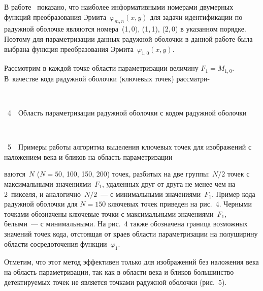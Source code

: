 \begin{multicols}{2}
В работе~\cite{5pav} показано, что наиболее информативными номерами двумерных функций 
преобразования Эрмита~$\varphi_{m,n}(x,y)$ для задачи идентификации по радужной оболочке 
являются номера~(1,\,0), (1,\,1), (2,\,0) в указанном порядке. Поэтому для параметризации данных 
радужной оболочки в данной работе была выбрана функция пре\-обра\-зо\-ва\-ния Эрмита~$\varphi_{1,0}(x,y)$. 

Рассмотрим в каждой точке области парамет\-ризации величину $F_1=M_{1,0}$. В~качестве кода 
радужной оболочки (ключевых точек) рассматри-\linebreak\vspace*{-12pt}
\pagebreak

\noindent
\begin{center} %
\mbox{%
\epsfxsize=80mm %
}
\end{center}
{{\figurename~4}\ \ \small{Область параметризации радужной оболочки с кодом радужной оболочки}}

\vspace*{18pt}

 
\begin{center}
\mbox{%
\epsfxsize=80mm %
}
\end{center}
{{\figurename~5}\ \ \small{Примеры работы алгоритма выделения ключевых точек для изображений с наложением века и бликов на область 
параметризации}}


\bigskip
\medskip
\addtocounter{figure}{2}

\noindent
ваются~$N$ ($N = 50$, 100, 150, 200) точек, 
разбитых на две группы: $N/2$ точек с максимальными значениями~$F_1$, удаленных друг от 
друга не менее чем на 2~пикселя, и аналогично~$N/2$~--- с минимальными значениями~$F_1$. 
Пример кода радужной оболочки для $N = 150$ ключевых точек приведен на рис.~4. 
Черными точками обозначены ключевые точки с максимальными значениями~$F_1$, белыми~--- 
с минимальными. На рис.~4 также обозначена граница возможных значений точек кода, 
отстоящая от краев области параметризации на полуширину области сосредоточения 
функции~$\varphi_1$.


Отметим, что этот метод эффективен только для изображений без наложения века на область 
параметризации, так как в области века и бликов большинство детектируемых точек не является 
точками радужной оболочки (рис.~5). 



\end{multicols}
